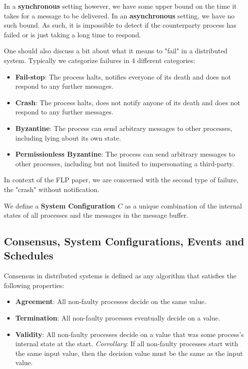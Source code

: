 In a \textbf{synchronous} setting however, we have some upper bound on the time it takes for a message to be delivered. In an \textbf{asynchronous} setting, we have no such bound. As such, it is impossible to detect if the counterparty process has failed or is just taking a long time to respond.

One should also discuss a bit about what it means to "fail" in a distributed system. Typically we categorize failures in 4 different categories:
\begin{itemize}
    \item \textbf{Fail-stop}: The process halts, notifies everyone of its death and does not respond to any further messages.
    \item \textbf{Crash}: The process halts, does not notify anyone of its death and does not respond to any further messages.
    \item \textbf{Byzantine}: The process can send arbitrary messages to other processes, including lying about its own state.
    \item \textbf{Permissionless Byzantine}: The process can send arbitrary messages to other processes, including but not limited to impersonating a third-party.
\end{itemize}

In context of the FLP paper, we are concerned with the second type of failure, the "crash" without notification.

We define a \textbf{System Configuration $C$} as a unique combination of the internal states of all processes and the messages in the message buffer.

\subsection{Consensus, System Configurations, Events and Schedules}
Consensus in distributed systems is defined as any algorithm that satisfies the following properties:
\begin{itemize}
    \item \textbf{Agreement}: All non-faulty processes decide on the same value.
    \item \textbf{Termination}: All non-faulty processes eventually decide on a value.
    \item \textbf{Validity}: All non-faulty processes decide on a value that was some process's internal state at the start. \emph{Corrollary}: If all non-faulty processes start with the same input value, then the decision value must be the same as the input value.
\end{itemize}

